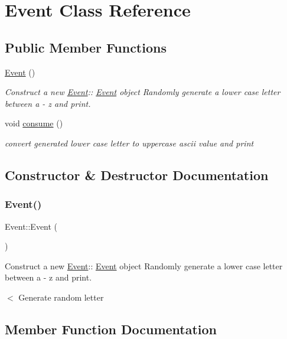 \hypertarget{classEvent}{}\section{Event Class Reference}
\label{classEvent}
\subsection*{Public Member Functions}
\begin{DoxyCompactItemize}
\item 
\hyperlink{classEvent_a5a40dd4708297f7031e29b39e039ae10}{Event} ()
\begin{DoxyCompactList}\small\item\em Construct a new \hyperlink{classEvent}{Event}\+:\+: \hyperlink{classEvent}{Event} object Randomly generate a lower case letter between a -\/ z and print. \end{DoxyCompactList}\item 
void \hyperlink{classEvent_ab57583f1d8975c19bd1c6448482d958d}{consume} ()
\begin{DoxyCompactList}\small\item\em convert generated lower case letter to uppercase ascii value and print \end{DoxyCompactList}\end{DoxyCompactItemize}


\subsection{Constructor \& Destructor Documentation}
\mbox{\label{classEvent_a5a40dd4708297f7031e29b39e039ae10}} 
\subsubsection{\texorpdfstring{Event()}{Event()}}
{\footnotesize\ttfamily Event\+::\+Event (\begin{DoxyParamCaption}{ }\end{DoxyParamCaption})}



Construct a new \hyperlink{classEvent}{Event}\+:\+: \hyperlink{classEvent}{Event} object Randomly generate a lower case letter between a -\/ z and print. 

$<$ Generate random letter 

\subsection{Member Function Documentation}
\mbox{\label{classEvent_ab57583f1d8975c19bd1c6448482d958d}} 
